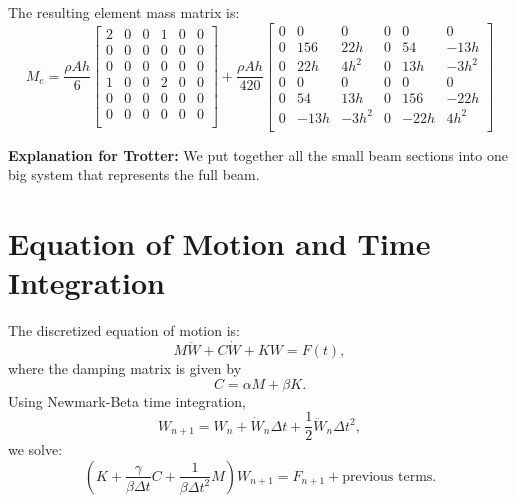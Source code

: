 \documentclass{article}
\begin{document}
	The resulting element mass matrix is:
	\begin{equation}
		M_e =
		\frac{\rho A h}{6}
		\begin{bmatrix}
			2 & 0 & 0 & 1 & 0 & 0 \\
			0 & 0 & 0 & 0 & 0 & 0 \\
			0 & 0 & 0 & 0 & 0 & 0 \\
			1 & 0 & 0 & 2 & 0 & 0 \\
			0 & 0 & 0 & 0 & 0 & 0 \\
			0 & 0 & 0 & 0 & 0 & 0 \\
		\end{bmatrix}
		+
		\frac{\rho A h}{420}
		\begin{bmatrix}
			0 & 0 & 0 & 0 & 0 & 0 \\
			0 & 156 & 22h & 0 & 54 & -13h \\
			0 & 22h & 4h^2 & 0 & 13h & -3h^2 \\
			0 & 0 & 0 & 0 & 0 & 0 \\
			0 & 54 & 13h & 0 & 156 & -22h \\
			0 & -13h & -3h^2 & 0 & -22h & 4h^2 \\
		\end{bmatrix}
	\end{equation}
	
	\textbf{Explanation for Trotter:} We put together all the small beam sections into one big system that represents the full beam.
	
	\section*{Equation of Motion and Time Integration}
	
	The discretized equation of motion is:
	\begin{equation}
		M \ddot{W} + C \dot{W} + K W = F(t),
	\end{equation}
	where the damping matrix is given by
	\begin{equation}
		C = \alpha M + \beta K.
	\end{equation}
	Using Newmark-Beta time integration,
	\begin{equation}
		W_{n+1} = W_n + \dot{W}_n \Delta t + \frac{1}{2} \ddot{W}_n \Delta t^2,
	\end{equation}
	we solve:
	\begin{equation}
		(K + \frac{\gamma}{\beta \Delta t} C + \frac{1}{\beta \Delta t^2} M) W_{n+1} = F_{n+1} + \text{previous terms}.
	\end{equation}
	
\end{document}
